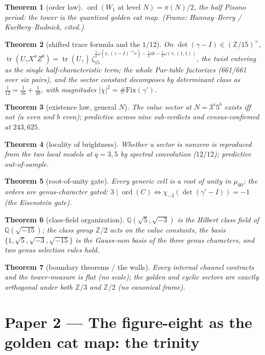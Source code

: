 \documentclass[11pt,reqno]{amsart}
\newtheorem{theorem}{Theorem}
\theoremstyle{definition}
\newcommand{\Q}{\mathbb{Q}}
\newcommand{\Z}{\mathbb{Z}}
\begin{document}
\begin{theorem}[order law]
$\operatorname{ord}(W_1 \text{ at level } N) = \pi(N)/2$, the half Pisano period: the tower
is the quantized golden cat map. (Frame: Hannay--Berry / Kurlberg--Rudnick, cited.)
\end{theorem}
\begin{theorem}[shifted trace formula and the $1/12$]
On $\det(\gamma-I)\in(\Z/15)^\times$,
$\operatorname{tr}(U_\gamma X^aZ^b)=\operatorname{tr}(U_\gamma)\,\zeta_{15}^{\frac12\omega(v,(\gamma-I)^{-1}v)-\frac12 ab-\frac12\omega(v,(1,1))}$,
the twist entering as the single half-characteristic term; the whole Par-table factorizes
(661/661 over six pairs), and the sector constant decomposes by determinant class as
$\tfrac1{12}=\tfrac1{16}+\tfrac1{48}$, with magnitudes $|\chi|^2=\#\mathrm{Fix}(\gamma')$.
\end{theorem}
\begin{theorem}[existence law, general $N$]
The value sector at $N=3^a5^b$ exists iff not ($a$ even and $b$ even); predictive across
nine sub-verdicts and census-confirmed at $243,625$.
\end{theorem}
\begin{theorem}[locality of brightness]
Whether a sector is nonzero is reproduced from the two local models at $q=3,5$ by spectral
convolution ($12/12$); predictive out-of-sample.
\end{theorem}
\begin{theorem}[root-of-unity gate]
Every generic cell is a root of unity in $\mu_{60}$; the orders are genus-character gated:
$3\mid\operatorname{ord}(C)\iff\chi_{-3}(\det(\gamma'-I))=-1$ (the Eisenstein gate).
\end{theorem}
\begin{theorem}[class-field organization]
$\Q(\sqrt5,\sqrt{-3})$ is the Hilbert class field of $\Q(\sqrt{-15})$; the class group
$\Z/2$ acts on the value constants, the basis $\{1,\sqrt5,\sqrt{-3},\sqrt{-15}\}$ is the
Gauss-sum basis of the three genus characters, and two genus selection rules hold.
\end{theorem}
\begin{theorem}[boundary theorems / the walls]
Every internal channel contracts and the tower-measure is flat (no scale); the golden and
cyclic sectors are exactly orthogonal under both $\Z/3$ and $\Z/2$ (no canonical frame).
\end{theorem}

\section*{Paper 2 --- The figure-eight as the golden cat map: the trinity}
\end{document}
